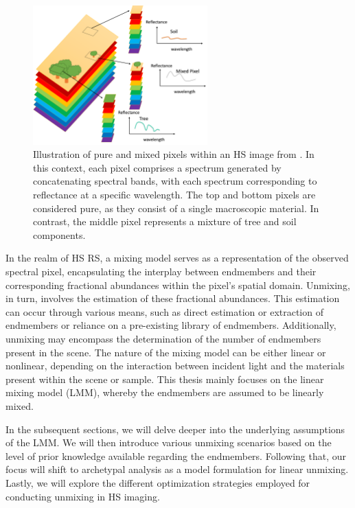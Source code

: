 \begin{figure}[h]
	\centering
	\includegraphics[width=0.6\textwidth]{fichiers_latex/Intro/Unmixing4.pdf}
	\caption{Illustration of pure and mixed pixels within an HS image from \cite{rasti_image_2023}. 
 In this context, each pixel comprises a spectrum generated by concatenating spectral bands, with each spectrum corresponding to reflectance at a specific wavelength.
 The top and bottom pixels are considered pure, as they consist of a single macroscopic material.
 In contrast, the middle pixel represents a mixture of tree and soil components.}
	\label{fig:unmixing}
\end{figure}

In the realm of HS RS, a mixing model serves as a representation of the observed spectral pixel, encapsulating the interplay between endmembers and their corresponding fractional abundances within the pixel's spatial domain.
Unmixing, in turn, involves the estimation of these fractional abundances.
This estimation can occur through various means, such as direct estimation or extraction of endmembers or reliance on a pre-existing library of endmembers.
Additionally, unmixing may encompass the determination of the number of endmembers present in the scene.
The nature of the mixing model can be either linear or nonlinear, depending on the interaction between incident light and the materials present within the scene or sample.
This thesis mainly focuses on the linear mixing model (LMM), whereby the endmembers are assumed to be linearly mixed.

In the subsequent sections, we will delve deeper into the underlying assumptions of the LMM.
We will then introduce various unmixing scenarios based on the level of prior knowledge available regarding the endmembers.
Following that, our focus will shift to archetypal analysis as a model formulation for linear unmixing.
Lastly, we will explore the different optimization strategies employed for conducting unmixing in HS imaging.

